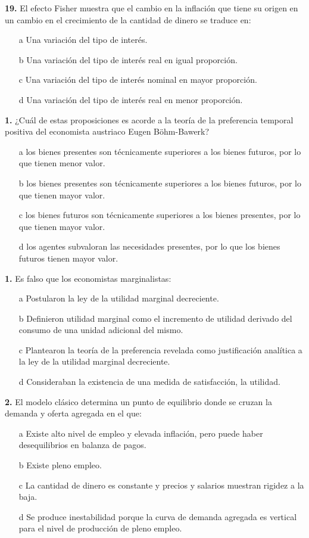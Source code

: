 \documentclass{nuevotema}
\begin{document}
\textbf{19.} El efecto Fisher muestra que el cambio en la inflación que tiene su origen en un cambio en el crecimiento de la cantidad de dinero se traduce en:
\begin{itemize}
	\item[a] Una variación del tipo de interés.
	\item[b] Una variación del tipo de interés real en igual proporción.
	\item[c] Una variación del tipo de interés nominal en mayor proporción.
	\item[d] Una variación del tipo de interés real en menor proporción.
\end{itemize}

\textbf{1.} ¿Cuál de estas proposiciones es acorde a la teoría de la preferencia temporal positiva del economista austriaco Eugen Böhm-Bawerk?
\begin{itemize}
	\item[a] los bienes presentes son técnicamente superiores a los bienes futuros, por lo que tienen menor valor.
	\item[b] los bienes presentes son técnicamente superiores a los bienes futuros, por lo que tienen mayor valor.
	\item[c] los bienes futuros son técnicamente superiores a los bienes presentes, por lo que tienen mayor valor.
	\item[d] los agentes subvaloran las necesidades presentes, por lo que los bienes futuros tienen mayor valor.
\end{itemize}

\textbf{1.} Es falso que los economistas marginalistas:
\begin{itemize}
	\item[a] Postularon la ley de la utilidad marginal decreciente.
	\item[b] Definieron utilidad marginal como el incremento de utilidad derivado del consumo de una unidad adicional del mismo.
	\item[c] Plantearon la teoría de la preferencia revelada como justificación analítica a la ley de la utilidad marginal decreciente.
	\item[d] Consideraban la existencia de una medida de satisfacción, la utilidad.
\end{itemize}

\textbf{2.} El modelo clásico determina un punto de equilibrio donde se cruzan la demanda y oferta agregada en el que:
\begin{itemize}
	\item[a] Existe alto nivel de empleo y elevada inflación, pero puede haber desequilibrios en balanza de pagos.
	\item[b] Existe pleno empleo.
	\item[c] La cantidad de dinero es constante y precios y salarios muestran rigidez a la baja.
	\item[d] Se produce inestabilidad porque la curva de demanda agregada es vertical para el nivel de producción de pleno empleo.
\end{itemize}
\end{document}
